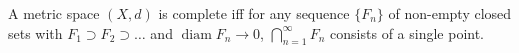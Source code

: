 A metric space $(X, d)$ is complete iff for any sequence $\{F_n\}$ of non-empty closed sets with $F_1 \supset F_2 \supset \ldots$ and $\operatorname{diam} F_n \to 0$, $\bigcap_{n=1}^{\infty} F_n$ consists of a single point.
